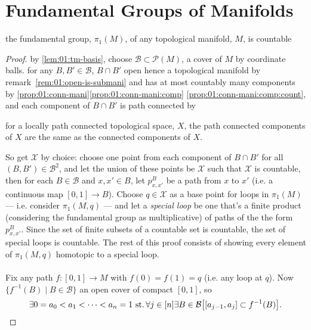 \section{Fundamental Groups of Manifolds}
\begin{prop}
  the fundamental group, $\pi_1(M)$,
  of any topological manifold, $M$, is countable
\end{prop}
\begin{proof}
  by \ref{lem:01:tm-basis}, choose
  $\mathscr B\subset\mathscr P(M)$,
  a cover of $M$ by coordinate balls.
  for any $B, B'\in\mathscr B$,
  $B\cap B'$ open hence a topological manifold
  by remark~\ref{rem:01:open-is-submani}
  and has at most countably many components by
  \ref{prop:01:conn-mani}\ref{prop:01:conn-mani:comp}
  \ref{prop:01:conn-mani:comp:count},
  and each component of $B\cap B'$ is path connected by
  \begin{fact}
    for a locally path connected topological space, $X$,
    the path connected components of $X$ are the same
    as the connected components of $X$.
  \end{fact}
  So get $\mathcal X$ by choice:
  choose one point from each component
  of $B\cap B'$ for all $(B, B')\in\mathcal B^2$,
  and let the union of these points be $\mathcal X$
  such that $\mathcal X$ is countable,
  then for each $B\in\mathcal B$ and $x, x'\in B$,
  let $p_{x,x'}^B$ be a path from $x$ to $x'$
  (i.e. a continuous map $[0, 1]\rightarrow B$).
  Choose $q\in\mathcal X$ as a base point for loops in $\pi_1(M)$
  --- i.e. consider $\pi_1(M, q)$ ---
  and let a \emph{special loop} be one that's a finite product
  (considering the fundamental group as multiplicative)
  of paths of the the form $p_{x,x'}^B$.
  Since the set of finite subsets of a countable set is countable,
  the set of special loops is countable.
  The rest of this proof consists of showing every element of
  $\pi_1(M, q)$ homotopic to a special loop.
  \paragraph{}
  Fix any path $f:[0,1]\rightarrow M$ with $f(0)=f(1)=q$
  (i.e. any loop at $q$).
  Now $\{f^{-1}(B) \mid B\in\mathcal B\}$ an open cover
  of compact $[0, 1]$, so
  \[
  \exists 0=a_0<a_1<\cdots<a_n=1\operatorname{\,st.}
  \forall j\in[n]\exists B\in\mathcal B
  \big[[a_{j-1}, a_j]\subset f^{-1}(B)\big].
  \]
\end{proof}

